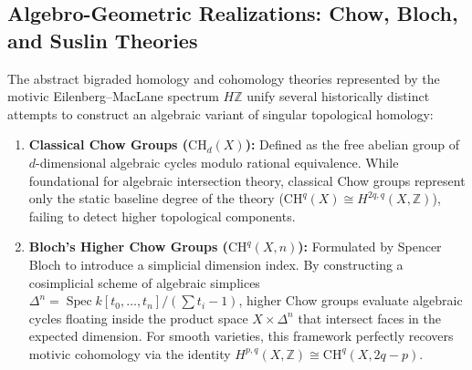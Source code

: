 \documentclass[11pt,oneside]{article}
\begin{document}
\subsection{Algebro-Geometric Realizations: Chow, Bloch, and Suslin Theories}
The abstract bigraded homology and cohomology theories represented by the motivic Eilenberg--MacLane spectrum $H\mathbb{Z}$ unify several historically distinct attempts to construct an algebraic variant of singular topological homology:
\begin{enumerate}
    \item \textbf{Classical Chow Groups ($\text{CH}_d(X)$):} Defined as the free abelian group of $d$-dimensional algebraic cycles modulo rational equivalence. While foundational for algebraic intersection theory, classical Chow groups represent only the static baseline degree of the theory ($\text{CH}^q(X) \cong H^{2q,q}(X, \mathbb{Z})$), failing to detect higher topological components.
    \item \textbf{Bloch's Higher Chow Groups ($\text{CH}^q(X, n)$):} Formulated by Spencer Bloch to introduce a simplicial dimension index. By constructing a cosimplicial scheme of algebraic simplices $\Delta^n = \operatorname{Spec} k[t_0, \dots, t_n]/(\sum t_i - 1)$, higher Chow groups evaluate algebraic cycles floating inside the product space $X \times \Delta^n$ that intersect faces in the expected dimension. For smooth varieties, this framework perfectly recovers motivic cohomology via the identity $H^{p,q}(X, \mathbb{Z}) \cong \text{CH}^q(X, 2q-p)$.

\end{enumerate}
\end{document}
